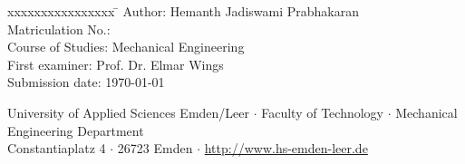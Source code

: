 \begin{titlepage}
    \vspace{0cm}
    \small
    \begin{tabbing}
        xxxxxxxxxxxxxxxx \= \kill
        Author: \> Hemanth Jadiswami Prabhakaran \\
        Matriculation No.:  \\
        Course of Studies: \> Mechanical Engineering \\ [0.5cm]
        First examiner: \> Prof. Dr. Elmar Wings \\
        Submission date: \> \today \\
    \end{tabbing}
    
    \vspace{0cm}
    \small
    \begin{center}
        University of Applied Sciences Emden/Leer $\cdot$ 
        Faculty of Technology $\cdot$ 
        Mechanical Engineering Department \\
        Constantiaplatz 4 $\cdot$ 
        26723 Emden $\cdot$ 
        \url{http://www.hs-emden-leer.de}
    \end{center}
    
\end{titlepage}
